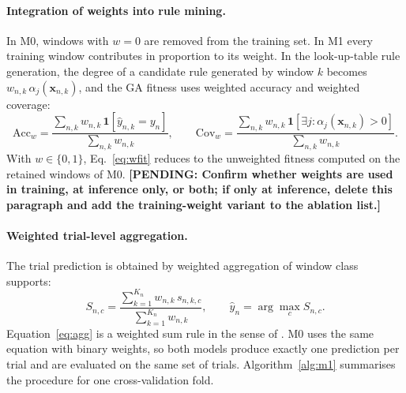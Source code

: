 \documentclass[11pt,a4paper]{article}
\newcommand{\pending}[1]{\textcolor{red!75!black}{\textbf{[PENDING: #1]}}}
\begin{document}
\paragraph{Integration of weights into rule mining.}
In M0, windows with $w=0$ are removed from the training set. In M1 every training window contributes in proportion to its weight. In the look-up-table rule generation, the degree of a candidate rule generated by window $k$ becomes $w_{n,k}\,\alpha_j(\mathbf{x}_{n,k})$, and the GA fitness uses weighted accuracy and weighted coverage:
\begin{equation}
\mathrm{Acc}_w = \frac{\sum_{n,k} w_{n,k}\,\mathbf{1}[\hat y_{n,k}=y_n]}{\sum_{n,k} w_{n,k}},\qquad
\mathrm{Cov}_w = \frac{\sum_{n,k} w_{n,k}\,\mathbf{1}[\exists j:\alpha_j(\mathbf{x}_{n,k})>0]}{\sum_{n,k} w_{n,k}}.
\label{eq:wfit}
\end{equation}
With $w\in\{0,1\}$, Eq.~\eqref{eq:wfit} reduces to the unweighted fitness computed on the retained windows of M0. \pending{Confirm whether weights are used in training, at inference only, or both; if only at inference, delete this paragraph and add the training-weight variant to the ablation list.}

\paragraph{Weighted trial-level aggregation.}
The trial prediction is obtained by weighted aggregation of window class supports:
\begin{equation}
S_{n,c} = \frac{\sum_{k=1}^{K_n} w_{n,k}\,s_{n,k,c}}{\sum_{k=1}^{K_n} w_{n,k}},\qquad
\hat y_n = \arg\max_{c} S_{n,c}.
\label{eq:agg}
\end{equation}
Equation~\eqref{eq:agg} is a weighted sum rule in the sense of \cite{Kittler1998}. M0 uses the same equation with binary weights, so both models produce exactly one prediction per trial and are evaluated on the same set of trials. Algorithm~\ref{alg:m1} summarises the procedure for one cross-validation fold.
\end{document}
